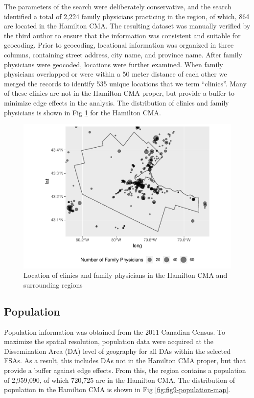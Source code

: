 \documentclass[10pt,letterpaper]{article}
\begin{document}
The parameters of the search were deliberately conservative, and the
search identified a total of 2,224 family physicians practicing in the
region, of which, 864 are located in the Hamilton CMA. The resulting
dataset was manually verified by the third author to ensure that the
information was consistent and suitable for geocoding. Prior to
geocoding, locational information was organized in three columns,
containing street address, city name, and province name. After family
physicians were geocoded, locations were further examined. When family
physicians overlapped or were within a 50 meter distance of each other
we merged the records to identify 535 unique locations that we term
``clinics''. Many of these clinics are not in the Hamilton CMA proper,
but provide a buffer to minimize edge effects in the analysis. The
distribution of clinics and family physicians is shown in Fig
\ref{fig:fig8-clinic-map} for the Hamilton CMA.

\begin{figure}
\includegraphics[width=0.95\linewidth]{Supply_and_Demand_Inflation_in_FCA_Methods_v2.0_files/figure-latex/fig8-clinic-map-1} \caption{\label{fig:fig8-clinic-map}Location of clinics and family physicians in the Hamilton CMA and surrounding regions}\label{fig:fig8-clinic-map}
\end{figure}

\subsection{Population}\label{population}

Population information was obtained from the 2011 Canadian Census. To
maximize the spatial resolution, population data were acquired at the
Dissemination Area (DA) level of geography for all DAs within the
selected FSAs. As a result, this includes DAs not in the Hamilton CMA
proper, but that provide a buffer against edge effects. From this, the
region contains a population of 2,959,090, of which 720,725 are in the
Hamilton CMA. The distribution of population in the Hamilton CMA is
shown in Fig \ref{fig:fig9-population-map}.
\end{document}
